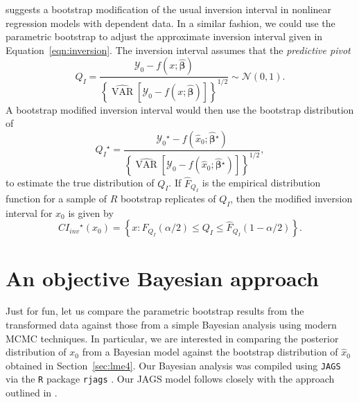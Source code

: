 \documentclass{article}\usepackage[]{graphicx}\usepackage[]{color}
\newcommand{\boot}{\ensuremath{^\star}}
\newcommand{\VAR}{\operatorname{VAR}}
\begin{document}
\citet{huet-statistical-2004} suggests a bootstrap modification of the usual inversion interval in nonlinear regression models with dependent data.  In a similar fashion, we could use the parametric bootstrap to adjust the approximate inversion interval given in Equation~\eqref{eqn:inversion}.  The inversion interval assumes that the \emph{predictive pivot}
\[
  Q_I = \frac{\mathcal{Y}_0-f\left(x; \widehat{\bm{\beta}}\right)}{\left\{ \widehat{\VAR}\left[\mathcal{Y}_0 - f\left(x; \widehat{\bm{\beta}}\right)\right] \right\}^{1/2}} \sim \mathcal{N}(0, 1).
\]
A bootstrap modified inversion interval would then use the bootstrap distribution of
\[
  Q_I\boot = \frac{\mathcal{Y}_0\boot-f\left(\widehat{x}_0; \widehat{\bm{\beta}}\boot\right)}{\left\{ \widehat{\VAR}\left[\mathcal{Y}_0 - f\left(\widehat{x}_0; \widehat{\bm{\beta}}\boot\right)\right] \right\}^{1/2}},
\]
to estimate the true distribution of $Q_I$.  If $\widehat{F}_{Q_I}$ is the empirical distribution function for a sample of $R$ bootstrap replicates of $Q_I$, then the modified inversion interval for $x_0$ is given by
\[
    CI_{inv}\boot\left(x_0\right) = \left\{ x: \widehat{F}_{Q_I}\left(\alpha/2\right) \le Q_I \le \widehat{F}_{Q_I}\left(1-\alpha/2\right) \right\}.
\]
\vspace{25pt}


\section{An objective Bayesian approach}
\label{sec:bayesian}

Just for fun, let us compare the parametric bootstrap results from the transformed data against those from a simple Bayesian analysis using modern MCMC techniques.  In particular, we are interested in comparing the posterior distribution of $x_0$ from a Bayesian model against the bootstrap distribution of $\widehat{x}_0$ obtained in Section~\ref{sec:lme4}.  Our Bayesian analysis was compiled using \texttt{JAGS} \citep{plummer-jags-2003} via the \texttt{R} package \texttt{rjags} \citep{plummer-rjags-2014}.  Our JAGS model follows closely with the approach outlined in \citet{hamada-bayesian-2003}.
\end{document}
